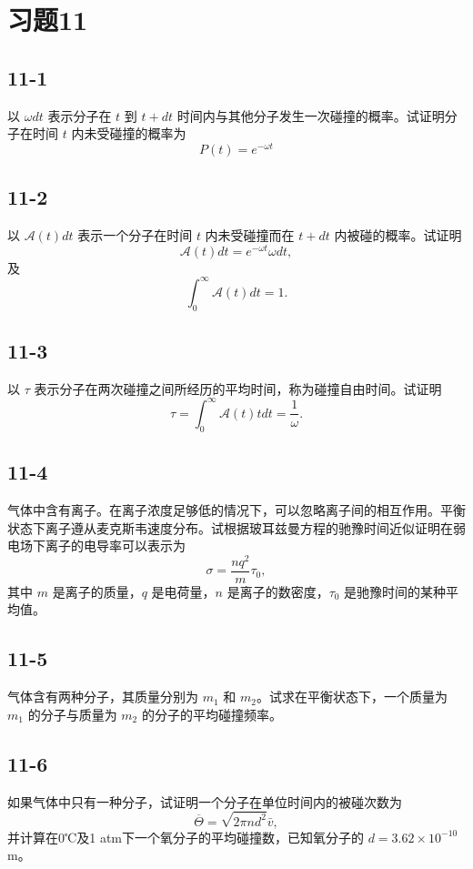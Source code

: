 \section{习题11}

\newpage
\subsection{11-1}
以 $\omega dt$ 表示分子在 $t$ 到 $t+dt$ 时间内与其他分子发生一次碰撞的概率。试证明分子在时间 $t$ 内未受碰撞的概率为
$$ P(t) = e^{-\omega t} $$

\newpage
\subsection{11-2}
以 $\mathcal{A}(t)dt$ 表示一个分子在时间 $t$ 内未受碰撞而在 $t+dt$ 内被碰的概率。试证明
$$ \mathcal{A}(t)dt = e^{-\omega t}\omega dt, $$
及
$$ \int_{0}^{\infty}\mathcal{A}(t)dt = 1. $$

\newpage
\subsection{11-3}
以 $\tau$ 表示分子在两次碰撞之间所经历的平均时间，称为碰撞自由时间。试证明
$$ \tau = \int_{0}^{\infty} \mathcal{A}(t) t dt = \frac{1}{\omega}. $$

\newpage
\subsection{11-4}
气体中含有离子。在离子浓度足够低的情况下，可以忽略离子间的相互作用。平衡状态下离子遵从麦克斯韦速度分布。试根据玻耳兹曼方程的驰豫时间近似证明在弱电场下离子的电导率可以表示为
$$ \sigma = \frac{nq^2}{m} \tau_0, $$
其中 $m$ 是离子的质量，$q$ 是电荷量，$n$ 是离子的数密度，$\tau_0$ 是驰豫时间的某种平均值。

\newpage
\subsection{11-5}
气体含有两种分子，其质量分别为 $m_{1}$ 和 $m_{2}$。试求在平衡状态下，一个质量为 $m_{1}$ 的分子与质量为 $m_{2}$ 的分子的平均碰撞频率。

\newpage
\subsection{11-6}
如果气体中只有一种分子，试证明一个分子在单位时间内的被碰次数为
$$ \overline{\Theta} = \sqrt{2 \pi n d^2} \bar{v}, $$
并计算在0℃及1 atm下一个氧分子的平均碰撞数，已知氧分子的 $d=3.62\times10^{-10}$ m。


